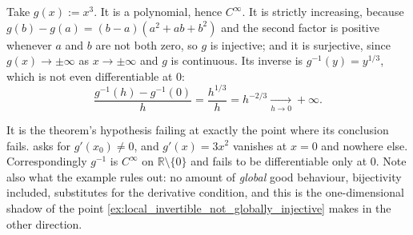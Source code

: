 \begin{exercisesolution}
\label{sol:box_smooth_bijection_rough_inverse}
Take $g(x) := x^3$. It is a polynomial, hence $C^\infty$. It is strictly increasing, because
$g(b) - g(a) = (b-a)(a^2+ab+b^2)$ and the second factor is positive whenever $a$ and $b$ are not
both zero, so $g$ is injective; and it is surjective, since $g(x) \to \pm\infty$ as
$x \to \pm\infty$ and $g$ is continuous. Its inverse is $g^{-1}(y) = y^{1/3}$, which is not even
differentiable at $0$:
\[\frac{g^{-1}(h) - g^{-1}(0)}{h} = \frac{h^{1/3}}{h} = h^{-2/3} \xrightarrow[h\to0]{} +\infty .\]

\begin{remark}
It is the theorem's hypothesis failing at exactly the point where its conclusion fails.
 asks for $g'(x_0) \neq 0$, and $g'(x) = 3x^2$ vanishes at
$x = 0$ and nowhere else. Correspondingly $g^{-1}$ is $C^\infty$ on $\mathbb{R}\setminus\{0\}$
and fails to be differentiable only at $0$. Note also what the example rules out: no amount of
\emph{global} good behaviour, bijectivity included, substitutes for the derivative condition, and
this is the one-dimensional shadow of the point \cref{ex:local_invertible_not_globally_injective}
makes in the other direction.
\end{remark}
\end{exercisesolution}

